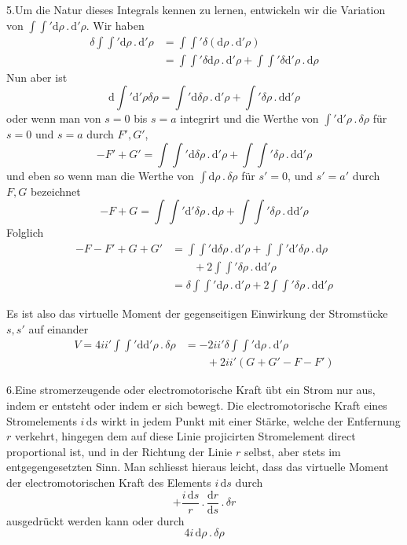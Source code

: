 5.\quad Um die Natur dieses Integrals kennen zu lernen, entwickeln wir die Variation von $\int\int'\mathrm d\rho\,.\,\mathrm d'\rho$. Wir haben
\[
\begin{aligned}
\delta\int\int'\mathrm d\rho\,.\,\mathrm d'\rho&=\int\int'\delta(\mathrm d\rho\,.\,\mathrm d'\rho)\\
&=\int\int'\delta\mathrm d\rho\,.\,\mathrm d'\rho+\int\int'\delta\mathrm d'\rho\,.\,\mathrm d\rho
\end{aligned}
\]
Nun aber ist
\[
\mathrm d\int'\mathrm d'\rho\delta\rho=\int'\mathrm d\delta\rho\,.\,\mathrm d'\rho+\int'\delta\rho\,.\,\mathrm d\mathrm d'\rho
\]
oder wenn man von $s=0$ bis $s=a$ integrirt und die Werthe von $\int'\mathrm d'\rho\,.\,\delta\rho$ für $s=0$ und $s=a$ durch $F',G'$,
\[
-F'+G'=\int\int'\mathrm d\delta\rho\,.\,\mathrm d'\rho+\int\int'\delta\rho\,.\,\mathrm d\mathrm d'\rho
\]
und eben so wenn man die Werthe von $\int\mathrm d\rho\,.\,\delta\rho$ für $s'=0$, und $s'=a'$ durch $F,G$ bezeichnet
\[
-F+G=\int\int'\mathrm d'\delta\rho\,.\,\mathrm d\rho+\int\int'\delta\rho\,.\,\mathrm d\mathrm d'\rho
\]
Folglich
\[
\begin{aligned}
-F-F'+G+G'&=\int\int'\mathrm d\delta\rho\,.\,\mathrm d'\rho+\int\int'\mathrm d'\delta\rho\,.\,\mathrm d\rho\\
&\qquad+2\int\int'\delta\rho\,.\,\mathrm d\mathrm d'\rho\\
&=\delta\int\int'\mathrm d\rho\,.\,\mathrm d'\rho+2\int\int'\delta\rho\,.\,\mathrm d\mathrm d'\rho
\end{aligned}
\]

Es ist also das virtuelle Moment der gegenseitigen Einwirkung der Stromstücke $s,s'$ auf einander
\[
\begin{aligned}
V=4ii'\int\int'\mathrm d\mathrm d'\rho\,.\,\delta\rho&=-2ii'\delta\int\int'\mathrm d\rho\,.\,\mathrm d'\rho\\
&\qquad+2ii'(G+G'-F-F')
\end{aligned}
\]

6.\quad Eine stromerzeugende oder electromotorische Kraft übt ein Strom nur aus, indem er entsteht oder indem er sich bewegt. Die electromotorische Kraft eines Stromelements $i\,\mathrm ds$ wirkt in jedem Punkt mit einer Stärke, welche der Entfernung $r$ verkehrt, hingegen dem auf diese Linie projicirten Stromelement direct proportional ist, und in der Richtung der Linie $r$ selbst, aber stets im entgegengesetzten Sinn. Man schliesst hieraus leicht, dass das virtuelle Moment der electromotorischen Kraft des Elements $i\,\mathrm ds$ durch
\[
+\frac{i\,\mathrm ds}{r}\,.\,\frac{\mathrm dr}{\mathrm ds}\,.\,\delta r
\]
ausgedrückt werden kann oder durch
\[
4i\,\mathrm d\rho\,.\,\delta\rho
\]

